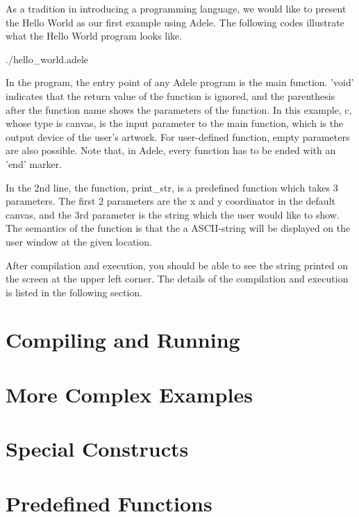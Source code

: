 \documentclass[11pt,letterpaper]{article}
\begin{document}
As a tradition in introducing a programming language, we would like to present the Hello World as our first example using Adele. The following codes illustrate what the Hello World program looks like.

 {./hello_world.adele}

In the program, the entry point of any Adele program is the main function. 'void' indicates that the return value of the function is ignored, and the parenthesis after the function name shows the parameters of the function. In this example, c, whose type is canvas, is the input parameter to the main function, which is the output device of the user's artwork. For user-defined function, empty parameters are also possible. Note that, in Adele, every function has to be ended with an 'end' marker.

In the 2nd line, the function, print\_str, is a predefined function which takes 3 parameters. The first 2 parameters are the x and y coordinator in the default canvas, and the 3rd parameter is the string which the user would like to show. The semantics of the function is that the a ASCII-string will be displayed on the user window at the given location.

After compilation and execution, you should be able to see the string printed on the screen at the upper left corner. The details of the compilation and execution is listed in the following section.

\section {Compiling and Running}

\section {More Complex Examples}

\section {Special Constructs}

\section {Predefined Functions}
\end{document}
